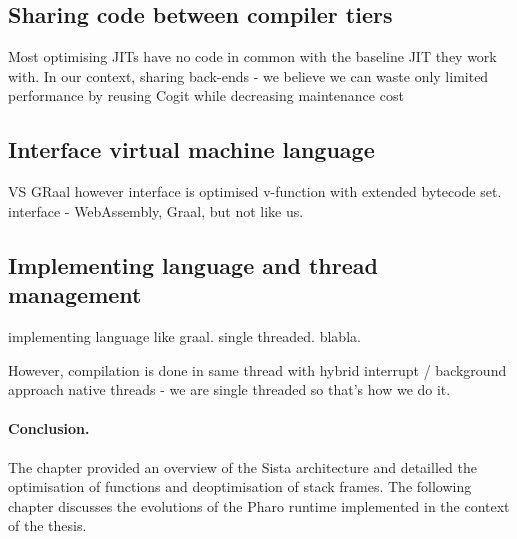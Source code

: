 \documentclass[a4paper,12pt,twoside]{../includes/ThesisStyle}
\begin{document}
\subsection{Sharing code between compiler tiers}
\label{sec:codeSharing}

Most optimising JITs have no code in common with the baseline JIT they work with. In our context, 
sharing back-ends - we believe we can waste only limited performance by reusing Cogit while decreasing maintenance cost

\subsection{Interface virtual machine language}
\label{sec:interface}
VS GRaal however interface is optimised v-function with extended bytecode set.
interface - WebAssembly, Graal, but not like us.


\subsection{Implementing language and thread management}
\label{sec:thread}
implementing language like graal. single threaded. blabla.

However, compilation is done in same thread with hybrid interrupt / background approach
native threads - we are single threaded so that's how we do it.



\paragraph{Conclusion.}
The chapter provided an overview of the Sista architecture and detailled the optimisation of functions and deoptimisation of stack frames. The following chapter discusses the evolutions of the Pharo runtime implemented in the context of the thesis.


\ifx\wholebook\relax\else
    
\end{document}
